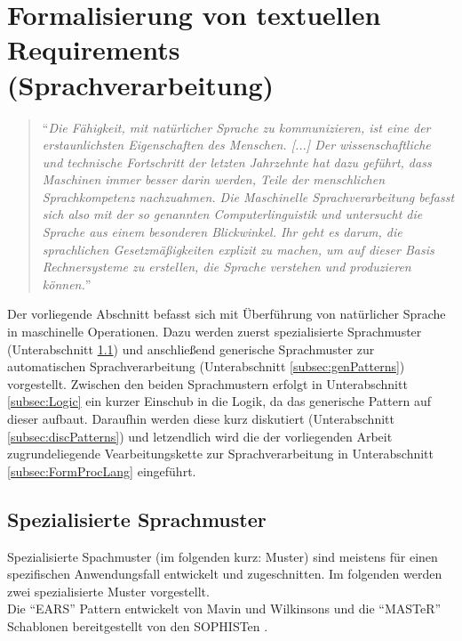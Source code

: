 \section{Formalisierung von textuellen Requirements (Sprachverarbeitung)}
\label{sec:Patterns}
\begin{quote}
	"`\textit{Die Fähigkeit, mit natürlicher Sprache zu kommunizieren, ist eine der erstaunlichsten Eigenschaften des Menschen. [...] Der wissenschaftliche und technische Fortschritt der letzten Jahrzehnte hat dazu geführt, dass Maschinen immer besser darin werden, Teile der menschlichen Sprachkompetenz nachzuahmen. Die Maschinelle Sprachverarbeitung befasst sich also mit der so genannten Computerlinguistik und untersucht die Sprache aus einem besonderen Blickwinkel. Ihr geht es darum, die sprachlichen Gesetzmäßigkeiten explizit zu machen, um auf dieser Basis Rechnersysteme zu erstellen, die Sprache verstehen und produzieren können.}"' \cite{IMS17}
\end{quote}
Der vorliegende Abschnitt befasst sich mit Überführung von natürlicher Sprache in maschinelle Operationen. Dazu werden zuerst spezialisierte Sprachmuster (Unterabschnitt \ref{subsec:specPatterns}) und anschließend generische Sprachmuster zur automatischen Sprachverarbeitung (Unterabschnitt \ref{subsec:genPatterns}) vorgestellt. Zwischen den beiden Sprachmustern erfolgt in Unterabschnitt \ref{subsec:Logic} ein kurzer Einschub in die Logik, da das generische Pattern auf dieser aufbaut. Daraufhin werden diese kurz diskutiert (Unterabschnitt \ref{subsec:discPatterns}) und letzendlich wird die der vorliegenden Arbeit zugrundeliegende Vearbeitungskette zur Sprachverarbeitung in Unterabschnitt \ref{subsec:FormProcLang} eingeführt.
\subsection{Spezialisierte Sprachmuster}
\label{subsec:specPatterns}
Spezialisierte Spachmuster (im folgenden kurz: Muster) sind meistens für einen spezifischen Anwendungsfall entwickelt und zugeschnitten. Im folgenden werden zwei spezialisierte Muster vorgestellt.\\
Die "`EARS"' Pattern entwickelt von Mavin und Wilkinsons \cite{MW10} und die "`MASTeR"' Schablonen bereitgestellt von den SOPHISTen \cite{JPQRSSV16}.\\

